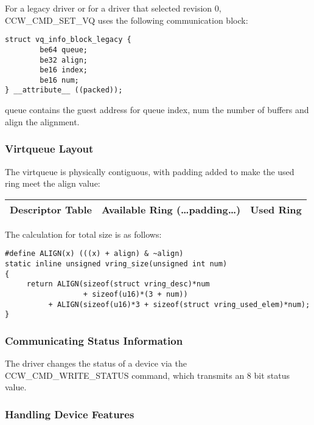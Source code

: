 For a legacy driver or for a driver that selected revision 0,
CCW_CMD_SET_VQ uses the following communication block:

\begin{lstlisting}
struct vq_info_block_legacy {
        be64 queue;
        be32 align;
        be16 index;
        be16 num;
} __attribute__ ((packed));
\end{lstlisting}

queue contains the guest address for queue index, num the number of buffers
and align the alignment.

\subsubsection{Virtqueue Layout}\label{sec:Virtio Transport Options / Virtio over channel I/O / Device Initialization / Virtqueue Layout}

The virtqueue is physically contiguous, with padding added to make the
used ring meet the align value:

\begin{tabular}{|l|l|l|}
\hline
Descriptor Table & Available Ring (\ldots padding\ldots) & Used Ring \\
\hline
\end{tabular}

The calculation for total size is as follows:

\begin{lstlisting}
#define ALIGN(x) (((x) + align) & ~align)
static inline unsigned vring_size(unsigned int num)
{
     return ALIGN(sizeof(struct vring_desc)*num
                  + sizeof(u16)*(3 + num))
          + ALIGN(sizeof(u16)*3 + sizeof(struct vring_used_elem)*num);
}
\end{lstlisting}

\subsubsection{Communicating Status Information}\label{sec:Virtio Transport Options / Virtio over channel I/O / Device Initialization / Communicating Status Information}

The driver changes the status of a device via the
CCW_CMD_WRITE_STATUS command, which transmits an 8 bit status
value.

\subsubsection{Handling Device Features}\label{sec:Virtio Transport Options / Virtio over channel I/O / Device Initialization / Handling Device Features}

